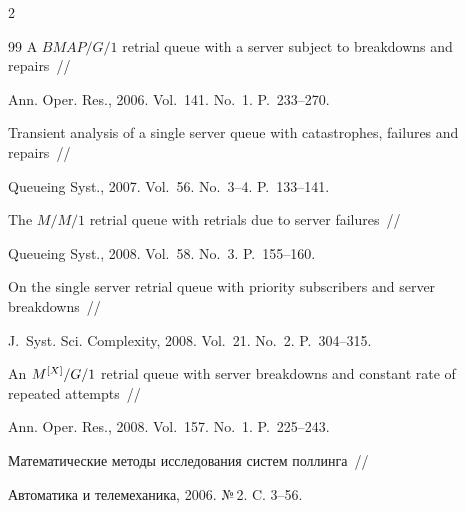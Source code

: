 \begin{multicols}{2}
{{\begin{thebibliography}{99}
A $BM\!AP/G/1$ retrial queue with a server subject to breakdowns and repairs~//


Ann. Oper. Res., 2006. Vol.~141. No.~1. P.~233--270.









Transient analysis of a single server queue with catastrophes, failures and repairs~//


Queueing Syst., 2007. Vol.~56. No.~3--4. P.~133--141.









The $M/M/1$ retrial queue with retrials due to server failures~//


Queueing Syst., 2008. Vol.~58. No.~3. P.~155--160.









On the single server retrial queue with priority subscribers and server breakdowns~//


J.\ Syst. Sci. Complexity, 2008. Vol.~21. No.~2. P.~304--315.









An $M\hphantom{}^{[X]}/G/1$ retrial queue with server breakdowns and constant rate of repeated attempts~//


Ann. Oper. Res., 2008. Vol.~157. No.~1. P.~225--243.









Математические методы исследования систем поллинга~//


Автоматика и телемеханика, 2006. №\,2. C. 3--56.








\end{thebibliography}}}
\end{multicols}
